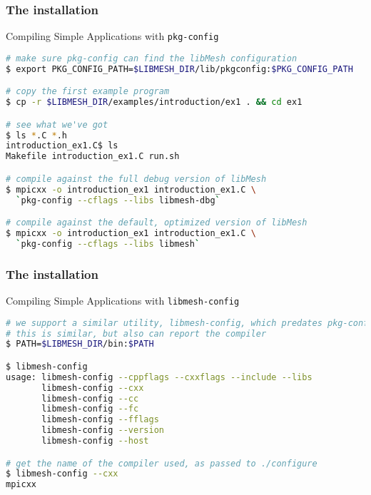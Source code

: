 \begin{frame}
  \frametitle{The \libMesh{} installation}

  \begin{block}{Compiling Simple Applications with \texttt{pkg-config}}
    \begin{lstlisting}[language=bash]
# make sure pkg-config can find the libMesh configuration
$ export PKG_CONFIG_PATH=$LIBMESH_DIR/lib/pkgconfig:$PKG_CONFIG_PATH

# copy the first example program
$ cp -r $LIBMESH_DIR/examples/introduction/ex1 . && cd ex1

# see what we've got
$ ls *.C *.h
introduction_ex1.C$ ls
Makefile introduction_ex1.C run.sh

# compile against the full debug version of libMesh
$ mpicxx -o introduction_ex1 introduction_ex1.C \
  `pkg-config --cflags --libs libmesh-dbg`

# compile against the default, optimized version of libMesh
$ mpicxx -o introduction_ex1 introduction_ex1.C \
  `pkg-config --cflags --libs libmesh`
    \end{lstlisting}
  \end{block}
\end{frame}






\begin{frame}[fragile,shrink]
  \frametitle{The \libMesh{} installation}

  \begin{block}{Compiling Simple Applications with \texttt{libmesh-config}}
    \begin{lstlisting}[language=bash]
# we support a similar utility, libmesh-config, which predates pkg-config support
# this is similar, but also can report the compiler
$ PATH=$LIBMESH_DIR/bin:$PATH

$ libmesh-config
usage: libmesh-config --cppflags --cxxflags --include --libs
       libmesh-config --cxx
       libmesh-config --cc
       libmesh-config --fc
       libmesh-config --fflags
       libmesh-config --version
       libmesh-config --host

# get the name of the compiler used, as passed to ./configure
$ libmesh-config --cxx
mpicxx
    \end{lstlisting}
  \end{block}
\end{frame}
